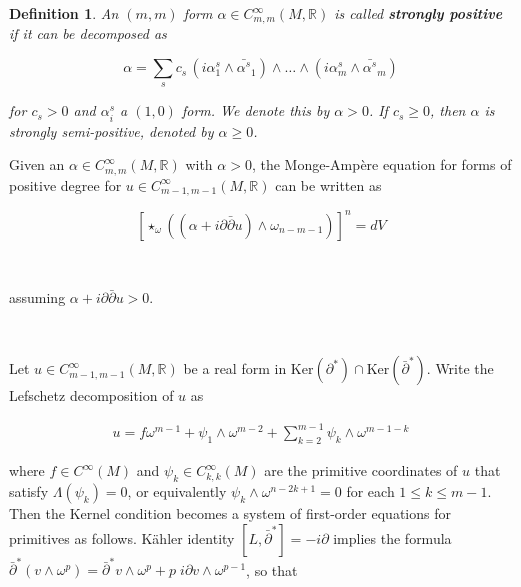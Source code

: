 \documentclass[10pt,a4paper]{amsart}
\newcommand{\sbpartial}{\bar{\partial}^*}
\newcommand{\pbp}{\partial \bar{\partial}}
\newtheorem{definition}[theorem]{Definition}
\numberwithin{equation}{section}
\begin{document}
\begin{definition}
    An $(m,m)$ form $\alpha \in C^{\infty}_{m,m}(M,\mathbb R)$ is called {\bf strongly positive} if it can be decomposed as 

     $$\alpha =  \sum_{s} c_s \, (i\alpha^s_1 \wedge \bar{\alpha^s}_1) \wedge \dots \wedge (i\alpha^s_m \wedge \bar{\alpha^s}_m)$$

     \noindent for $c_s >0$ and $\alpha^s_i$ a $(1,0)$ form. We denote this by $\alpha >0$. If $c_s \geq 0$, then $\alpha$ is strongly semi-positive, denoted by $\alpha \geq 0$. 
\end{definition}






Given an $\alpha \in C^{\infty}_{m,m}(M, \mathbb R)$ with $\alpha >0$, the Monge-Amp\`ere equation for forms of positive degree for $u \in C_{m-1,m-1}^{\infty}(M, \mathbb R)$ can be written as

\begin{equation}\label{MA-eqn}
    \left[\star_{\omega}\left((\alpha + i \pbp u)\wedge \omega_{n-m-1}\right)\right]^n = dV
\end{equation}

\ 

\noindent assuming $\alpha + i \pbp u >0$.


\bigskip


{\flushleft {} }
\
\bigskip 

 
Let $u \in C^{\infty}_{m-1,m-1}(M, \mathbb R)$ be a real form in $\mbox{Ker}(\partial^*)\cap \text{Ker}(\bar{\partial}^*)$. Write the Lefschetz decomposition of $u$ as

\begin{equation}
    \begin{aligned}
        u = f \omega^{m-1} + \psi_1 \wedge \omega^{m-2} + \sum\limits_{k =2}^{m-1}\psi_{k} \wedge \omega^{m-1-k}  
    \end{aligned}
\end{equation}


\noindent where $f \in C^{\infty}(M)$ and $\psi_{k} \in C^{\infty}_{k,k}(M)$ are the primitive coordinates of $u$ that satisfy $\Lambda(\psi_k) = 0$, or equivalently $\psi_{k} \wedge \omega^{n-2k+1} = 0$ for each $1 \leq k \leq m-1$. Then the Kernel condition becomes a system of first-order equations for primitives as follows. K\"ahler identity $[L, \sbpartial] = -i \partial $ implies the formula $\sbpartial (v \wedge \omega^p) = \sbpartial v \wedge \omega^{p}+ p \;i \partial v \wedge \omega^{p-1}$, so that
\end{document}
